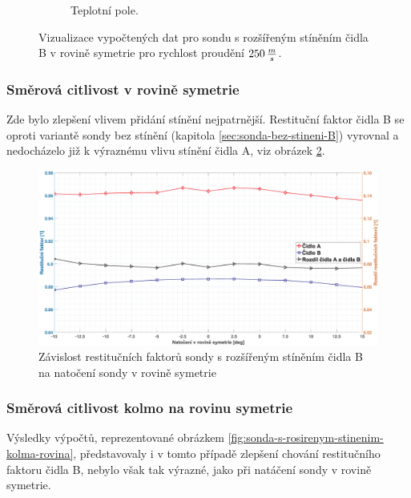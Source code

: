 \begin{figure}[ht!]
\begin{subfigure}{0.45\textwidth}
                    \caption{Teplotní pole.}
                \end{subfigure}
                \caption{Vizualizace vypočtených dat pro sondu s rozšířeným stíněním čidla B v rovině symetrie pro rychlost proudění $250 \, \frac{m}{s}$.}
                \label{fig:sonda-s-rozsirenym-stinenim-B-vizualizace}
            \end{figure}
        \newpage
        \subsubsection{Směrová citlivost v rovině symetrie}
            Zde bylo zlepšení vlivem přidání stínění nejpatrnější. Restituční faktor čidla B se oproti variantě sondy bez stínění (kapitola \ref{sec:sonda-bez-stineni-B}) vyrovnal a nedocházelo již k výraznému vlivu stínění čidla A, viz obrázek \ref{fig:sonda-s-rosirenym-stinenim-rovina-symetrie}.
            
            \begin{figure}[ht!]
                \centering
                \includegraphics*[width=\textwidth]{400_SIMULACE_KONSTRUKCNICH_UPRAV/Grafy/03_rovina_symetrie}
                \caption{Závislost restitučních faktorů sondy s rozšířeným stíněním čidla B na natočení sondy v rovině symetrie}
                \label{fig:sonda-s-rosirenym-stinenim-rovina-symetrie}
            \end{figure}
        \subsubsection{Směrová citlivost kolmo na rovinu symetrie}
            Výsledky výpočtů, reprezentované obrázkem \ref{fig:sonda-s-rosirenym-stinenim-kolma-rovina}, představovaly i v tomto případě zlepšení chování restitučního faktoru čidla B, nebylo však tak výrazné, jako při natáčení sondy v rovině symetrie.
            
